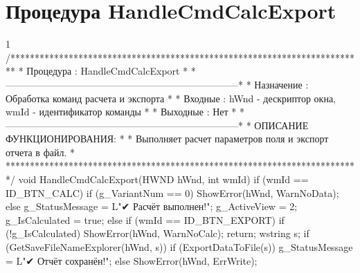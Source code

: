 \section{Процедура HandleCmdCalcExport}
\footnotesize
\begin{listing}{1}
/*************************************************************************
* Процедура     : HandleCmdCalcExport                                    *
*------------------------------------------------------------------------*
* Назначение    : Обработка команд расчета и экспорта                    *
* Входные       : hWnd - дескриптор окна, wmId - идентификатор команды   *
* Выходные      : Нет                                                    *
*------------------------------------------------------------------------*
* ОПИСАНИЕ ФУНКЦИОНИРОВАНИЯ:                                             *
* Выполняет расчет параметров поля и экспорт отчета в файл.              *
*************************************************************************/
void HandleCmdCalcExport(HWND hWnd, int wmId) {
    if (wmId == ID_BTN_CALC) {
        if (g_VariantNum == 0) ShowError(hWnd, WarnNoData);
        else { g_StatusMessage = L"✔ Расчёт выполнен!"; g_ActiveView = 2; 
            g_IsCalculated = true;}
    }
    else if (wmId == ID_BTN_EXPORT) {
        if (!g_IsCalculated) { ShowError(hWnd, WarnNoCalc); 
            return;}
        wstring s;
        if (GetSaveFileNameExplorer(hWnd, s)) {
            if (ExportDataToFile(s)) 
                g_StatusMessage = L"✔ Отчёт сохранён!";
            else 
                ShowError(hWnd, ErrWrite);}
    }
}
\end{listing}
\normalsize

\pagebreak

